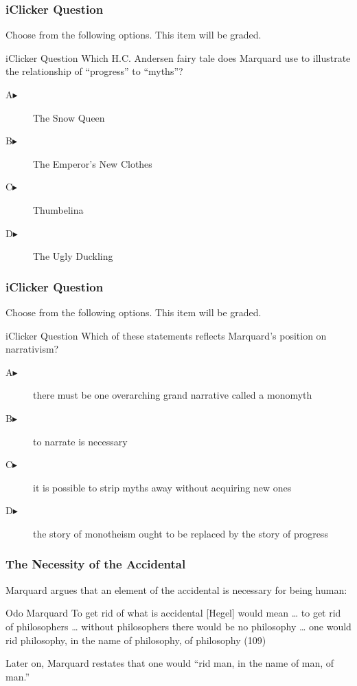 \documentclass[xcolor=dvipsnames]{beamer}
\begin{document}
\begin{frame}
  \frametitle{iClicker Question}
Choose from the following options. This item will be graded.
\begin{block}{iClicker Question}
Which H.C. Andersen fairy tale does Marquard use to illustrate the
relationship of ``progress'' to ``myths''?
\end{block}
\begin{description}
\item[A\hspace{.2in}$\blacktriangleright$] The Snow Queen
\item[B\hspace{.2in}$\blacktriangleright$] The Emperor's New Clothes
\item[C\hspace{.2in}$\blacktriangleright$] Thumbelina
\item[D\hspace{.2in}$\blacktriangleright$] The Ugly Duckling
\end{description}
\end{frame}

\begin{frame}
  \frametitle{iClicker Question}
Choose from the following options. This item will be graded.
\begin{block}{iClicker Question}
Which of these statements reflects Marquard's position on narrativism?
\end{block}
\begin{description}
\item[A\hspace{.2in}$\blacktriangleright$] there must be one
  overarching grand narrative called a monomyth
\item[B\hspace{.2in}$\blacktriangleright$] to narrate is necessary
\item[C\hspace{.2in}$\blacktriangleright$] it is possible to strip
  myths away without acquiring new ones
\item[D\hspace{.2in}$\blacktriangleright$] the story of monotheism
  ought to be replaced by the story of progress
\end{description}
\end{frame}

\begin{frame}
  \frametitle{The Necessity of the Accidental}
  Marquard argues that an element of the accidental is necessary for
  being human: 
  \begin{block}{Odo Marquard}
    To get rid of what is accidental [Hegel] would mean {\ldots} to
    get rid of philosophers {\ldots} without philosophers there would
    be no philosophy {\ldots} one would rid philosophy, in the name of
    philosophy, of philosophy (109)
  \end{block}
Later on, Marquard restates that one would ``rid man, in the name of
man, of man.''
\end{frame}
\end{document}

